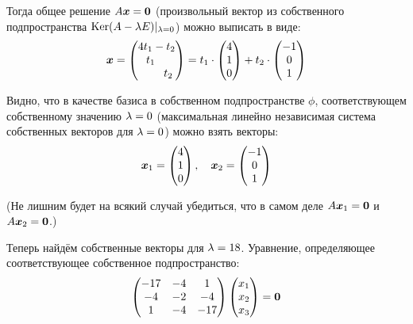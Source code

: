 \documentclass[a4paper,12pt]{article}
\theoremstyle{remark}
\begin{document}
\begin{solution}
  Тогда общее решение $A \bds x \hm= \bds 0$ (произвольный вектор из собственного подпространства $\Ker (A \hm- \lambda E)|_{\lambda = 0}$) можно выписать в виде:
  \[
    \boldsymbol x = \begin{pmatrix}
      4 t_1 - t_2\\
      \hphantom{4} t_1 \hphantom{- t_2}\\
      \hphantom{4 t_1 -} t_2
    \end{pmatrix}
    = t_1 \cdot \begin{pmatrix}
      4 \\ 1 \\ 0
    \end{pmatrix}
    + t_2 \cdot \begin{pmatrix}
      -1 \\ 0 \\ 1
    \end{pmatrix}
  \]
  
  Видно, что в качестве базиса в собственном подпространстве $\phi$, соответствующем собственному значению $\lambda \hm= 0$ (максимальная линейно независимая система собственных векторов для $\lambda \hm= 0$) можно взять векторы:
  \[
    \boldsymbol x_1 = \begin{pmatrix}
      4 \\ 1 \\ 0
    \end{pmatrix},\quad
    \boldsymbol x_2 = \begin{pmatrix}
      -1 \\ 0 \\ 1
    \end{pmatrix}
  \]
  
  (Не лишним будет на всякий случай убедиться, что в самом деле $A \bds x_1 \hm= \bds 0$ и $A \bds x_2 \hm= \bds 0$.)
  
  \medskip
  
  Теперь найдём собственные векторы для $\lambda \hm= 18$.
  Уравнение, определяющее соответствующее собственное подпространство:
  \[
    \begin{pmatrix}
      -17 & -4 & 1\\
      -4 & -2 & -4\\
      1 & -4 & -17
    \end{pmatrix} \begin{pmatrix}
      x_1 \\ x_2 \\ x_3
    \end{pmatrix} = \boldsymbol 0
  \]
  

\end{solution}
\end{document}
